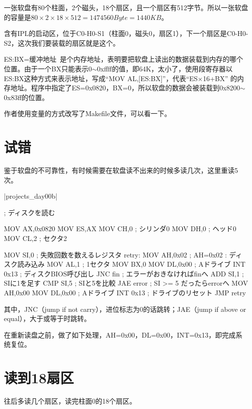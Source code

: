 一张软盘有80个柱面，2个磁头，18个扇区，且一个扇区有512字节。所以一张软盘的容量是$80\times 2\times 18\times 512=1474560 Byte= 1440KB$。

含有IPL的启动区，位于C0-H0-S1（柱面0，磁头0，扇区1），下一个扇区是C0-H0-S2，这次我们要装载的扇区就是这个。

ES:BX=缓冲地址~是个内存地址，表明要把软盘上读出的数据装载到内存的哪个位置。由于一个BX只能表示0$\sim$0xffff的值，即64K，太小了，使用段寄存器以ES:BX这种方式来表示地址，写成“MOV AL,[ES:BX]”，代表“ES$\times$16+BX” 的内存地址。程序中指定了ES=0x0820，BX=0，所以软盘的数据会被装载到0x8200$\sim$0x83ff的位置。
\cs

作者使用变量的方式改写了Makefile文件，可以看一下。

\section{	试错	}
鉴于软盘的不可靠性，有时候需要在软盘读不出来的时候多读几次，这里重读5 次。

\dag|projects_day\harib00b|
\begin{code}[label=ipl.nas 本次添加的部分]
; ディスクを読む

		MOV		AX,0x0820
		MOV		ES,AX
		MOV		CH,0			; シリンダ0
		MOV		DH,0			; ヘッド0
		MOV		CL,2			; セクタ2

		MOV		SI,0			; 失敗回数を数えるレジスタ
retry:
		MOV		AH,0x02			; AH=0x02 : ディスク読み込み
		MOV		AL,1			; 1セクタ
		MOV		BX,0
		MOV		DL,0x00			; Aドライブ
		INT		0x13			; ディスクBIOS呼び出し
		JNC		fin				; エラーがおきなければfinへ
		ADD		SI,1			; SIに1を足す
		CMP		SI,5			; SIと5を比較
		JAE		error			; SI >= 5 だったらerrorへ
		MOV		AH,0x00
		MOV		DL,0x00			; Aドライブ
		INT		0x13			; ドライブのリセット
		JMP		retry
\end{code}

其中，JNC（jump if not carry），进位标志为0的话跳转；JAE（jump if above or equal），大于或等于时跳转。

在重新读盘之前，做了如下处理，AH=0x00，DL=0x00，INT=0x13，即完成系统复位。
\section{	读到18扇区	}
往后多读几个扇区，读完柱面0的18个扇区。

